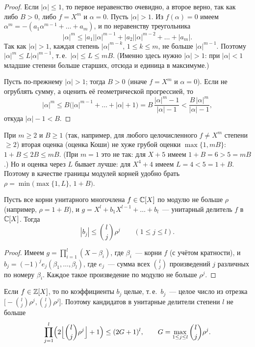 \begin{proof}
Если $|\alpha|\le1$, то первое неравенство очевидно, а второе верно, так как либо $B>0$, либо $f=X^m$ и $\alpha=0$.
Пусть $|\alpha|>1$. Из $f(\alpha)=0$ имеем $\alpha^m=-(a_1\alpha^{m-1}+\dots+a_m)$, и по неравенству треугольника
\[
|\alpha|^m\le|a_1||\alpha|^{m-1}+|a_2||\alpha|^{m-2}+\dots+|a_m| .
\]
Так как $|\alpha|>1$, каждая степень $|\alpha|^{m-k}$, $1\le k\le m$, не больше $|\alpha|^{m-1}$. Поэтому
$|\alpha|^m\le L|\alpha|^{m-1}$, т.\,е.\ $|\alpha|\le L\le mB$. (Именно здесь нужно $|\alpha|>1$: при $|\alpha|<1$
младшие степени больше старших, отсюда и единица в максимуме.)

Пусть по-прежнему $|\alpha|>1$; тогда $B>0$ (иначе $f=X^m$ и $\alpha=0$). Если не огрублять сумму, а оценить её
геометрической прогрессией, то
\[
|\alpha|^m\le B\bigl(|\alpha|^{m-1}+\dots+|\alpha|+1\bigr)=B\,\frac{|\alpha|^m-1}{|\alpha|-1}<\frac{B\,|\alpha|^m}{|\alpha|-1},
\]
откуда $|\alpha|-1<B$.
\end{proof}

При $m\ge2$ и $B\ge1$ (так, например, для любого целочисленного $f\ne X^m$ степени $\ge2$) вторая оценка (оценка Коши)
не хуже грубой оценки $\max\{1,mB\}$: $1+B\le2B\le mB$. (При $m=1$ это не так: для $X+5$ имеем $1+B=6>5=mB$.) Но и
оценка через $L$ бывает лучше: для $X^4+4$ имеем $L=4<5=1+B$. Поэтому в качестве границы модулей корней удобно брать
$\rho=\min\bigl(\max\{1,L\},\,1+B\bigr)$.

\begin{proposition}
Пусть все корни унитарного многочлена $f\in\mathbb C[X]$ по модулю не больше $\rho$ (например, $\rho=1+B$), и
$g=X^l+b_1X^{l-1}+\dots+b_l$~--- унитарный делитель $f$ в $\mathbb C[X]$. Тогда
\[
|b_j|\le\binom lj\rho^j\qquad(1\le j\le l).
\]
\end{proposition}

\begin{proof}
Имеем $g=\prod_{i=1}^l(X-\beta_i)$, где $\beta_i$~--- корни $f$ (с учётом кратности), и $b_j=(-1)^je_j(\beta_1,\dots,\beta_l)$,
где $e_j$~--- сумма всех $\binom lj$ произведений $j$ различных по номеру $\beta_i$. Каждое такое произведение по модулю не
больше $\rho^j$.
\end{proof}

Если $f\in\mathbb Z[X]$, то по  коэффициенты $b_j$ целые, т.\,е.\ $b_j$~--- целое число из отрезка
$\bigl[-\binom lj\rho^j,\binom lj\rho^j\bigr]$. Поэтому кандидатов в унитарные делители степени $l$ не больше
\[
\prod_{j=1}^l\Bigl(2\Bigl\lfloor\binom lj\rho^j\Bigr\rfloor+1\Bigr)\le(2G+1)^l,\qquad G=\max_{1\le j\le l}\binom lj\rho^j .
\]

